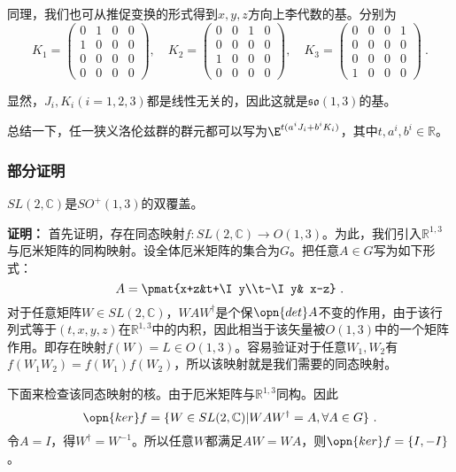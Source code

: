 同理，我们也可从推促变换的形式得到$x,y,z$方向上李代数的基。分别为
\begin{equation}
K_1=\begin{pmatrix}0&1&0&0\\1&0&0&0\\0&0&0&0\\0&0&0&0\end{pmatrix},\quad K_2=\begin{pmatrix}0&0&1&0\\0&0&0&0\\1&0&0&0\\0&0&0&0\end{pmatrix},\quad K_3=\begin{pmatrix}0&0&0&1\\0&0&0&0\\0&0&0&0\\1&0&0&0\end{pmatrix}~.
\end{equation}

显然，$J_i,K_i(i=1,2,3)$都是线性无关的，因此这就是$\mathfrak{so}(1,3)$的基。

总结一下，任一狭义洛伦兹群的群元都可以写为$\E^{t(a^iJ_i+b^iK_i)}$，其中$t,a^i,b^i\in\mathbb R$。
\subsubsection{部分证明}
\begin{theorem}{}
$SL(2,\mathbb C)$是$SO^+(1,3)$的双覆盖。
\end{theorem}
\textbf{证明：}
首先证明，存在同态映射$f:SL(2,\mathbb C)\to O(1,3)$。为此，我们引入$\mathbb R^{1,3}$与厄米矩阵的同构映射。设全体厄米矩阵的集合为$G$。把任意$A\in G$写为如下形式：
\begin{equation}\label{eq_qed1_5}
A=\pmat{x+z&t+\I y\\t-\I y& x-z}~.
\end{equation}
对于任意矩阵$W\in SL(2,\mathbb C)$，$WAW^{\dagger}$是个保$\opn{det} A$不变的作用，由于该行列式等于$(t,x,y,z)$在$\mathbb R^{1,3}$中的内积，因此相当于该矢量被$O(1,3)$中的一个矩阵作用。即存在映射$f(W)=L\in O(1,3)$。容易验证对于任意$W_1,W_2$有$f(W_1W_2)=f(W_1)f(W_2)$，所以该映射就是我们需要的同态映射。

下面来检查该同态映射的核。由于厄米矩阵与$\mathbb R^{1,3}$同构。因此
\begin{equation}
\opn{ker} f=\{W\in SL(2,\mathbb C)|WAW^{\dagger}=A,\forall A\in G \}~.
\end{equation}
令$A=I$，得$W^{\dagger}=W^{-1}$。所以任意$W$都满足$AW=WA$，则$\opn{ker} f=\{I,-I\}$。

